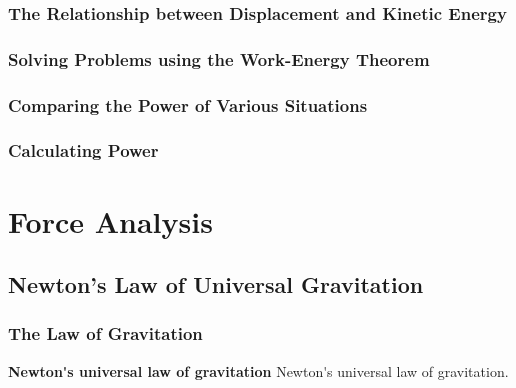 \documentclass[dvipsnames]{article}
\newif\ifShowUnitV                               %
\begin{document}
\subsubsection{The Relationship between Displacement and Kinetic Energy}

\subsubsection{Solving Problems using the Work-Energy Theorem}

\subsubsection{Comparing the Power of Various Situations}

\subsubsection{Calculating Power}

\fi

\clearpage

\section{Force Analysis}

\ifShowUnitV
\setcounter{example}{0}

\subsection{Newton's Law of Universal Gravitation}

\subsubsection{The Law of Gravitation}

\textbf{\gls{Newton's universal law of gravitation}} \glsdesc{Newton's universal law of gravitation}.

\begin{center}
\end{center}
\end{document}
